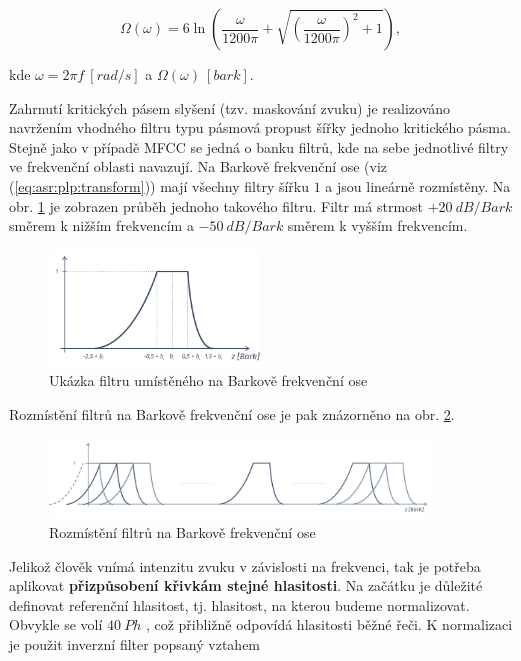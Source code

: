 \begin{equation}
  \Omega\left(\omega\right) = 6 \ln \left( \frac{\omega}{1200\pi} + \sqrt{\left(\frac{\omega}{1200\pi}\right)^2 + 1} \right),
  \label{eq:asr:plp:transform}
\end{equation}

\noindent kde $\omega = 2\pi f\ \left[rad/s\right]$ a $\Omega\left(\omega\right)\ \left[bark\right]$.

Zahrnutí kritických pásem slyšení (tzv. maskování zvuku) je realizováno navržením vhodného filtru typu pásmová propust šířky jednoho kritického pásma. Stejně jako v případě MFCC se jedná o banku filtrů, kde na sebe jednotlivé filtry ve frekvenční oblasti navazují. Na Barkově frekvenční ose (viz (\ref{eq:asr:plp:transform})) mají všechny filtry šířku $1$ a jsou lineárně rozmístěny. Na obr. \ref{fig:asr:plp:filter} je zobrazen průběh jednoho takového filtru. Filtr má strmost $+20\ dB/Bark$ směrem k nižším frekvencím a $-50\ dB/Bark$ směrem k vyšším frekvencím.

\begin{figure}[hbpt]
  \centering
  \includegraphics[width=0.5\textwidth]{./ch4-asr/img/plp_filter.pdf}
  \caption{Ukázka filtru umístěného na Barkově frekvenční ose}
  \label{fig:asr:plp:filter}
\end{figure}

Rozmístění filtrů na Barkově frekvenční ose je pak znázorněno na obr. \ref{fig:asr:plp:bank}.

\begin{figure}[hbpt]
  \centering
  \includegraphics[width=0.9\textwidth]{./ch4-asr/img/plp-bank.pdf}
  \caption{Rozmístění filtrů na Barkově frekvenční ose}
  \label{fig:asr:plp:bank}
\end{figure}

Jelikož člověk vnímá intenzitu zvuku v závislosti na frekvenci, tak je potřeba aplikovat \textbf{přizpůsobení křivkám stejné hlasitosti}. Na začátku je důležité definovat referenční hlasitost, tj. hlasitost, na kterou budeme normalizovat. Obvykle se volí $40\ Ph$ \cite{Psutka2006}, což přibližně odpovídá hlasitosti běžné řeči. K normalizaci je použit inverzní filter popsaný vztahem

